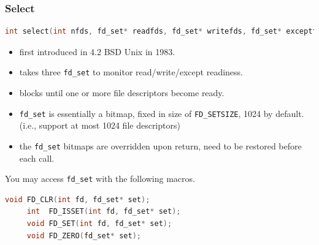 \documentclass[aspectratio=43]{beamer}
\begin{document}
\begin{frame}[fragile]
  \frametitle{Select}
  \hspace*{2em} \begin{minipage}{.8\textwidth}
  \begin{lstlisting}[language=C++,basicstyle=\ttfamily\footnotesize,commentstyle=\color{commgreen},keywordstyle=\color{blue},breaklines=true]
int select(int nfds, fd_set* readfds, fd_set* writefds, fd_set* exceptfds, struct timeval* timeout);
   \end{lstlisting}
   \end{minipage}
   \begin{itemize}
	 \item first introduced in 4.2 BSD Unix in 1983.
	 \item takes three {\tt fd\_set} to monitor read/write/except readiness.
	 \item blocks until one or more file descriptors become ready.
	 \item {\tt fd\_set} is essentially a bitmap, fixed in size of {\tt FD\_SETSIZE}, 1024 by default. (i.e., support at most 1024 file descriptors)
	 \item the {\tt fd\_set} bitmaps are overridden upon return, need to be restored before each call.
	 \end{itemize}
    \vspace{1em} 
     \hspace*{2em}\begin{minipage}{.8\textwidth}
   You may access {\tt fd\_set} with the following macros.
   \end{minipage}
     \begin{lstlisting}[language=C++,basicstyle=\ttfamily\footnotesize,commentstyle=\color{commgreen},keywordstyle=\color{blue},breaklines=true]
     void FD_CLR(int fd, fd_set* set);
     int  FD_ISSET(int fd, fd_set* set);
     void FD_SET(int fd, fd_set* set);
     void FD_ZERO(fd_set* set);
   \end{lstlisting}
\end{frame}
\end{document}
